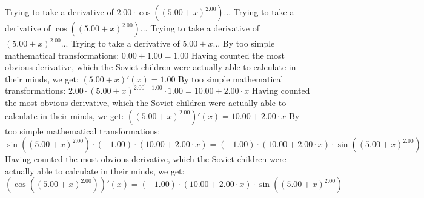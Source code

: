 \documentclass{article}
\begin{document}
\newline
Trying to take a derivative of ${{2.00} \cdot  \cos {\left({\left({{5.00} + {x}}\right) ^ {2.00}}\right)} }$...\newline
\newline
Trying to take a derivative of $ \cos {\left({\left({{5.00} + {x}}\right) ^ {2.00}}\right)} $...\newline
\newline
Trying to take a derivative of ${\left({{5.00} + {x}}\right) ^ {2.00}}$...\newline
\newline
Trying to take a derivative of ${{5.00} + {x}}$...\newline
\newline
By too simple mathematical transformations:
 ${{0.00} + {1.00}} = {1.00}$ 
 \newline
 \newline 
Having counted the most obvious derivative, which the Soviet children were actually able to calculate in their minds, we get:
$({{5.00} + {x}})'(x) = {1.00}$\newline
\newline
By too simple mathematical transformations:
 ${{{2.00} \cdot {\left({{5.00} + {x}}\right) ^ {{2.00} - {1.00}}}} \cdot {1.00}} = {{10.00} + {{2.00} \cdot {x}}}$ 
 \newline
 \newline 
Having counted the most obvious derivative, which the Soviet children were actually able to calculate in their minds, we get:
$({\left({{5.00} + {x}}\right) ^ {2.00}})'(x) = {{10.00} + {{2.00} \cdot {x}}}$\newline
\newline
By too simple mathematical transformations:
 ${{ \sin {\left({\left({{5.00} + {x}}\right) ^ {2.00}}\right)}  \cdot \left({-1.00}\right)} \cdot \left({{10.00} + {{2.00} \cdot {x}}}\right)} = {\left({-1.00}\right) \cdot {\left({{10.00} + {{2.00} \cdot {x}}}\right) \cdot  \sin {\left({\left({{5.00} + {x}}\right) ^ {2.00}}\right)} }}$ 
 \newline
 \newline 
Having counted the most obvious derivative, which the Soviet children were actually able to calculate in their minds, we get:
$( \cos {\left({\left({{5.00} + {x}}\right) ^ {2.00}}\right)} )'(x) = {\left({-1.00}\right) \cdot {\left({{10.00} + {{2.00} \cdot {x}}}\right) \cdot  \sin {\left({\left({{5.00} + {x}}\right) ^ {2.00}}\right)} }}$\newline
\newline
\end{document}
